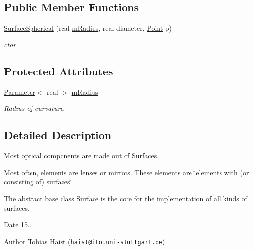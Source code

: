 \subsection*{Public Member Functions}
\begin{DoxyCompactItemize}
\item 
\hyperlink{classSurfaceSpherical_ab316d1d811ac3ef1032dcf6da0fe0763}{Surface\+Spherical} (real \hyperlink{classSurfaceSpherical_a056c0dba260183f9a2bc555e94310166}{m\+Radius}, real diameter, \hyperlink{classPoint}{Point} p)
\begin{DoxyCompactList}\small\item\em ctor \end{DoxyCompactList}\end{DoxyCompactItemize}
\subsection*{Protected Attributes}
\begin{DoxyCompactItemize}
\item 
\hyperlink{classParameter}{Parameter}$<$ real $>$ \hyperlink{classSurfaceSpherical_a056c0dba260183f9a2bc555e94310166}{m\+Radius}\hypertarget{classSurfaceSpherical_a056c0dba260183f9a2bc555e94310166}{}\label{classSurfaceSpherical_a056c0dba260183f9a2bc555e94310166}

\begin{DoxyCompactList}\small\item\em Radius of curvature. \end{DoxyCompactList}\end{DoxyCompactItemize}


\subsection{Detailed Description}
Most optical components are made out of Surfaces. 

Most often, elements are lenses or mirrors. These elements are \char`\"{}elements with (or consisting of) surfaces\char`\"{}.

The abstract base class \hyperlink{classSurface}{Surface} is the core for the implementation of all kinds of surfaces.

\begin{DoxyDate}{Date}
15.. 
\end{DoxyDate}
\begin{DoxyAuthor}{Author}
Tobias Haist (\href{mailto:haist@ito.uni-stuttgart.de}{\tt haist@ito.\+uni-\/stuttgart.\+de}) 
\end{DoxyAuthor}



